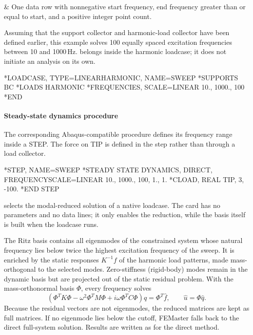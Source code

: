 \begin{keyworddata}
 & One data row with nonnegative start frequency, end frequency greater than or equal to start, and a positive integer point count. \\
\end{keyworddata}

Assuming that the support collector  and harmonic-load collector
 have been defined earlier, this example solves 100
equally spaced excitation frequencies between 10 and 1000\,Hz.
 belongs inside the harmonic loadcase; it does not
initiate an analysis on its own.

\exampleheading
\begin{inputdeck}
*LOADCASE, TYPE=LINEARHARMONIC, NAME=SWEEP
*SUPPORTS
BC
*LOADS
HARMONIC
*FREQUENCIES, SCALE=LINEAR
10., 1000., 100
*END
\end{inputdeck}

\paragraph*{Steady-state dynamics procedure}

The corresponding Abaqus-compatible procedure defines its frequency range inside a STEP. The force on TIP is defined in the step rather than through a load collector.
\begin{inputdeck}
*STEP, NAME=SWEEP
*STEADY STATE DYNAMICS, DIRECT,
 FREQUENCYSCALE=LINEAR
10., 1000., 100, 1., 1.
*CLOAD, REAL
TIP, 3, -100.
*END STEP
\end{inputdeck}


 selects the modal-reduced solution of a native  loadcase. The card has no parameters and no data lines; it only enables the reduction, while the basis itself is built when the loadcase runs.

The Ritz basis contains all eigenmodes of the constrained system whose natural frequency lies below twice the highest excitation frequency of the sweep. It is enriched by the static responses \(K^{-1}f\) of the harmonic load patterns, made mass-orthogonal to the selected modes. Zero-stiffness (rigid-body) modes remain in the dynamic basis but are projected out of the static residual problem. With the mass-orthonormal basis \(\Phi\), every frequency solves
\[
\left(\Phi^TK\Phi-\omega^2\Phi^TM\Phi+i\omega\Phi^TC\Phi\right)\hat q=\Phi^T\hat f,
\qquad \hat u=\Phi\hat q.
\]
Because the residual vectors are not eigenmodes, the reduced matrices are kept as full matrices. If no eigenmode lies below the cutoff, FEMaster falls back to the direct full-system solution. Results are written as for the direct method.


